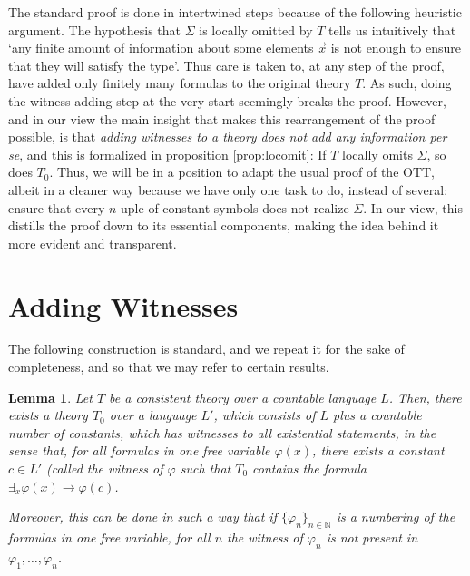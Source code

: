 \documentclass{article}
\newtheorem{lemma}{Lemma}
\theoremstyle{nonumberplain}
\newcommand{\N}{\mathbb{N}}
\begin{document}
The standard proof is done in intertwined steps because of the following heuristic argument. The hypothesis that $\Sigma$ is locally omitted by $T$ tells us intuitively that `any finite amount of information about some elements $\vec x$ is not enough to ensure that they will satisfy the type'. Thus care is taken to, at any step of the proof, have added only finitely many formulas to the original theory $T$. As such, doing the witness-adding step at the very start seemingly breaks the proof. However, and in our view the main insight that makes this rearrangement of the proof possible, is that \emph{adding witnesses to a theory does not add any information \textit{per se}}, and this is formalized in proposition \ref{prop:locomit}: If $T$ locally omits $\Sigma$, so does $T_0$. Thus, we will be in a position to adapt the usual proof of the OTT, albeit in a cleaner way because we have only one task to do, instead of several: ensure that every $n$-uple of constant symbols does not realize $\Sigma$. In our view, this distills the proof down to its essential components, making the idea behind it more evident and transparent.


\section{Adding Witnesses}

The following construction is standard, and we repeat it for the sake of completeness, and so that we may refer to certain results.

\begin{lemma}\label{lemma:witnesses}
Let $T$ be a consistent theory over a countable language $L$. Then, there exists a theory $T_0$ over a language $L'$, which consists of $L$ plus a countable number of constants, which has witnesses to all existential statements, in the sense that, for all formulas in one free variable $\varphi(x)$, there exists a constant $c \in L'$ (called the \emph{witness of $\varphi$} such that $T_0$ contains the formula $\exists_x \varphi(x) \rightarrow \varphi(c)$.

Moreover, this can be done in such a way that if $\{\varphi_n\}_{n \in \N}$ is a numbering of the formulas in one free variable, for all $n$ the witness of $\varphi_n$ is not present in $\varphi_1, \dots, \varphi_n$.
\end{lemma}
\end{document}
